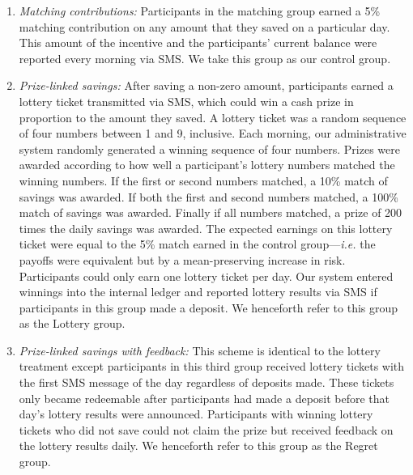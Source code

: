 \documentclass[11pt]{article}
\begin{document}
		\begin{enumerate} \setlength{\itemsep}{1pt}

			\item \textit{Matching contributions:} Participants in the matching group earned a 5\% matching contribution on any amount that they saved on a particular day. This amount of the incentive and the participants' current balance were reported every morning via SMS. We take this group as our control group.

			\item \textit{Prize-linked savings:} After saving a non-zero amount, participants earned a lottery ticket transmitted via SMS, which could win a cash prize in proportion to the amount they saved. A lottery ticket was a random sequence of four numbers between 1 and 9, inclusive. Each morning, our administrative system randomly generated a winning sequence of four numbers. Prizes were awarded according to how well a participant's lottery numbers matched the winning numbers. If the first or second numbers matched, a 10\% match of savings was awarded. If both the first and second numbers matched, a 100\% match of savings was awarded. Finally if all numbers matched, a prize of 200 times the daily savings was awarded. The expected earnings on this lottery ticket were equal to the 5\% match earned in the control group---\textit{i.e.} the payoffs were equivalent but by a mean-preserving increase in risk. Participants could only earn one lottery ticket per day. Our system entered winnings into the internal ledger and reported lottery results via SMS if participants in this group made a deposit. We henceforth refer to this group as the Lottery group.

			\item \textit{Prize-linked savings with feedback:} This scheme is identical to the lottery treatment except participants in this third group received lottery tickets with the first SMS message of the day regardless of deposits made. These tickets only became redeemable after participants had made a deposit before that day's lottery results were announced. Participants with winning lottery tickets who did not save could not claim the prize but received feedback on the lottery results daily. We henceforth refer to this group as the Regret group.

		\end{enumerate}

		

		\clearpage
\end{document}
